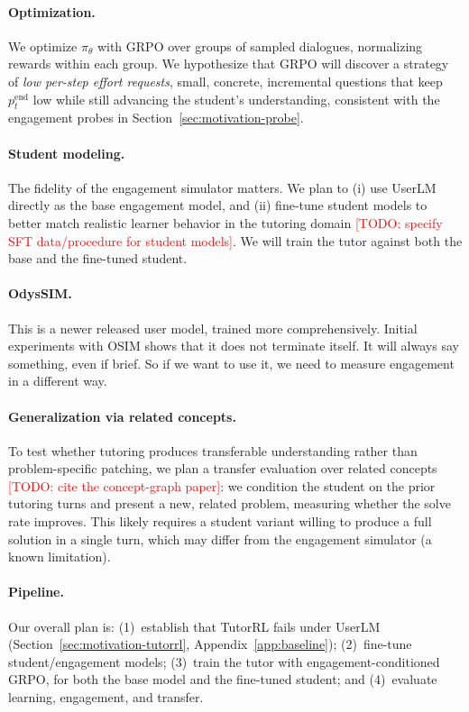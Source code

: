 \documentclass[11pt]{article}
\newcommand{\todo}[1]{\textcolor{red}{[TODO: #1]}}
\begin{document}
\paragraph{Optimization.} We optimize $\pi_\theta$ with GRPO over groups of
sampled dialogues, normalizing rewards within each group. We hypothesize that
GRPO will discover a strategy of \emph{low per-step effort requests}, small,
concrete, incremental questions that keep $p^{\text{end}}_t$ low while still
advancing the student's understanding, consistent with the engagement probes in
Section~\ref{sec:motivation-probe}.

\paragraph{Student modeling.} The fidelity of the engagement simulator matters.
We plan to (i) use UserLM directly as the base engagement model, and (ii)
fine-tune student models to better match realistic learner behavior in the
tutoring domain \todo{specify SFT data/procedure for student models}. We will
train the tutor against both the base and the fine-tuned student.

\paragraph{OdysSIM.} This is a newer released user model, trained more comprehensively. Initial experiments with OSIM shows that it does not terminate itself. It will always say something, even if brief. So if we want to use it, we need to measure engagement in a different way. 

\paragraph{Generalization via related concepts.} To test whether tutoring
produces transferable understanding rather than problem-specific patching, we
plan a transfer evaluation over related concepts \todo{cite the concept-graph
paper}: we condition the student on the prior tutoring turns and present a new,
related problem, measuring whether the solve rate improves. This likely requires
a student variant willing to produce a full solution in a single turn, which may
differ from the engagement simulator (a known limitation).

\paragraph{Pipeline.} Our overall plan is: (1)~establish that TutorRL fails under
UserLM (Section~\ref{sec:motivation-tutorrl}, Appendix~\ref{app:baseline});
(2)~fine-tune student/engagement models; (3)~train the tutor with
engagement-conditioned GRPO, for both the base model and the fine-tuned student;
and (4)~evaluate learning, engagement, and transfer.
\end{document}

